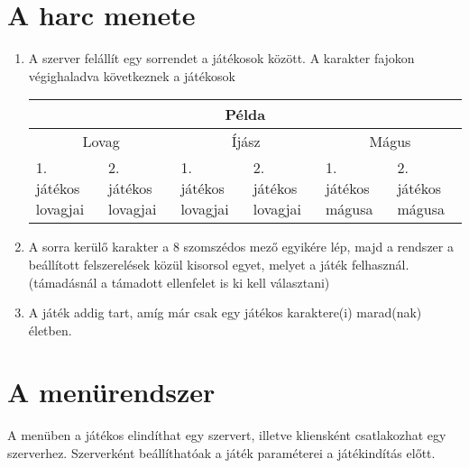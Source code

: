 \section{A harc menete}
\begin{enumerate}
\item A szerver felállít egy sorrendet a játékosok között. A karakter fajokon végighaladva következnek a játékosok

\newcommand{\owntabnr}{4cm}
\newcommand{\colwid}{\textwidth-\owntabnr)/6}
\begin{tabular}{ |p{(\colwid}|p{(\colwid}|p{(\colwid}|p{(\colwid}|p{(\colwid}|p{(\colwid}|  }
	\hline
	\multicolumn{6}{|c|}{Példa} \\
	\hline
	\multicolumn{2}{|c|}{Lovag}& \multicolumn{2}{|c|}{Íjász} & \multicolumn{2}{|c|}{Mágus} \\
	\hline
	1. játékos lovagjai & 2. játékos lovagjai & 1. játékos lovagjai & 2. játékos lovagjai  & 1. játékos mágusa & 2. játékos mágusa \\
	\hline
\end{tabular}
\item A sorra kerülő karakter a 8 szomszédos mező egyikére lép, majd a rendszer a beállított felszerelések közül kisorsol egyet, melyet a játék felhasznál. (támadásnál a támadott ellenfelet is ki kell választani)
\item A játék addig tart, amíg már csak egy játékos karaktere(i) marad(nak) életben.
\end{enumerate}


\section{A menürendszer}
A menüben a játékos elindíthat egy szervert, illetve kliensként csatlakozhat egy szerverhez. Szerverként beállíthatóak a játék paraméterei a játékindítás előtt.

